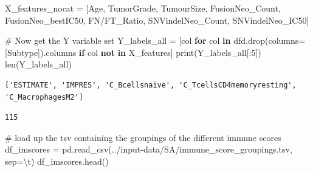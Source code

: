 \documentclass[
  letterpaper,
  DIV=11,
  numbers=noendperiod]{scrartcl}
\newenvironment{Shaded}{\begin{snugshade}}{\end{snugshade}}
\newcommand{\BuiltInTok}[1]{\textcolor[rgb]{0.00,0.23,0.31}{#1}}
\newcommand{\CharTok}[1]{\textcolor[rgb]{0.13,0.47,0.30}{#1}}
\newcommand{\CommentTok}[1]{\textcolor[rgb]{0.37,0.37,0.37}{#1}}
\newcommand{\ControlFlowTok}[1]{\textcolor[rgb]{0.00,0.23,0.31}{\textbf{#1}}}
\newcommand{\DecValTok}[1]{\textcolor[rgb]{0.68,0.00,0.00}{#1}}
\newcommand{\KeywordTok}[1]{\textcolor[rgb]{0.00,0.23,0.31}{\textbf{#1}}}
\newcommand{\NormalTok}[1]{\textcolor[rgb]{0.00,0.23,0.31}{#1}}
\newcommand{\OperatorTok}[1]{\textcolor[rgb]{0.37,0.37,0.37}{#1}}
\newcommand{\StringTok}[1]{\textcolor[rgb]{0.13,0.47,0.30}{#1}}
\begin{document}
\begin{Shaded}
\begin{Highlighting}[]
\NormalTok{X\_features\_nocat }\OperatorTok{=}\NormalTok{ [}\StringTok{\textquotesingle{}Age\textquotesingle{}}\NormalTok{, }\StringTok{\textquotesingle{}TumorGrade\textquotesingle{}}\NormalTok{, }\StringTok{\textquotesingle{}TumourSize\textquotesingle{}}\NormalTok{, }\StringTok{\textquotesingle{}FusionNeo\_Count\textquotesingle{}}\NormalTok{, }\StringTok{\textquotesingle{}FusionNeo\_bestIC50\textquotesingle{}}\NormalTok{, }\StringTok{\textquotesingle{}FN/FT\_Ratio\textquotesingle{}}\NormalTok{, }\StringTok{\textquotesingle{}SNVindelNeo\_Count\textquotesingle{}}\NormalTok{, }\StringTok{\textquotesingle{}SNVindelNeo\_IC50\textquotesingle{}}\NormalTok{]}
\end{Highlighting}
\end{Shaded}

\begin{Shaded}
\begin{Highlighting}[]
\CommentTok{\# Now get the Y variable set}
\NormalTok{Y\_labels\_all }\OperatorTok{=}\NormalTok{ [col }\ControlFlowTok{for}\NormalTok{ col }\KeywordTok{in}\NormalTok{ dfd.drop(columns}\OperatorTok{=}\NormalTok{[}\StringTok{\textquotesingle{}Subtype\textquotesingle{}}\NormalTok{]).columns }\ControlFlowTok{if}\NormalTok{ col }\KeywordTok{not} \KeywordTok{in}\NormalTok{ X\_features]}
\BuiltInTok{print}\NormalTok{(Y\_labels\_all[:}\DecValTok{5}\NormalTok{])}
\BuiltInTok{len}\NormalTok{(Y\_labels\_all)}
\end{Highlighting}
\end{Shaded}

\begin{verbatim}
['ESTIMATE', 'IMPRES', 'C_Bcellsnaive', 'C_TcellsCD4memoryresting', 'C_MacrophagesM2']
\end{verbatim}

\begin{verbatim}
115
\end{verbatim}

\begin{Shaded}
\begin{Highlighting}[]
\CommentTok{\# load up the tsv containing the groupings of the different immune scores}
\NormalTok{df\_imscores }\OperatorTok{=}\NormalTok{ pd.read\_csv(}\StringTok{\textquotesingle{}../input{-}data/SA/immune\_score\_groupings.tsv\textquotesingle{}}\NormalTok{, sep}\OperatorTok{=}\StringTok{\textquotesingle{}}\CharTok{\textbackslash{}t}\StringTok{\textquotesingle{}}\NormalTok{)}
\NormalTok{df\_imscores.head()}
\end{Highlighting}
\end{Shaded}
\end{document}
